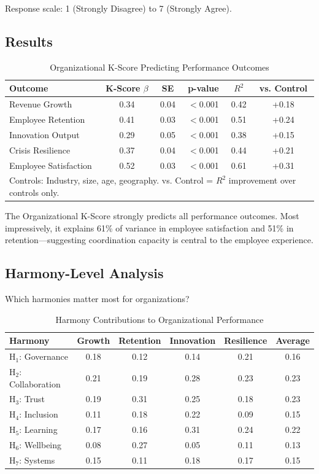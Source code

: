 \documentclass[12pt,a4paper]{article}
\begin{document}
Response scale: 1 (Strongly Disagree) to 7 (Strongly Agree).

\subsection{Results}

\begin{table}[H]
\centering
\caption{Organizational K-Score Predicting Performance Outcomes}
\label{tab:org_results}
\begin{tabular}{lccccc}
\toprule
\textbf{Outcome} & \textbf{K-Score $\beta$} & \textbf{SE} & \textbf{p-value} & \textbf{$R^2$} & \textbf{vs. Control} \\
\midrule
Revenue Growth & 0.34 & 0.04 & $<$0.001 & 0.42 & +0.18 \\
Employee Retention & 0.41 & 0.03 & $<$0.001 & 0.51 & +0.24 \\
Innovation Output & 0.29 & 0.05 & $<$0.001 & 0.38 & +0.15 \\
Crisis Resilience & 0.37 & 0.04 & $<$0.001 & 0.44 & +0.21 \\
Employee Satisfaction & 0.52 & 0.03 & $<$0.001 & 0.61 & +0.31 \\
\bottomrule
\multicolumn{6}{l}{\small Controls: Industry, size, age, geography. vs. Control = $R^2$ improvement over controls only.}
\end{tabular}
\end{table}

The Organizational K-Score strongly predicts all performance outcomes. Most impressively, it explains 61\% of variance in employee satisfaction and 51\% in retention---suggesting coordination capacity is central to the employee experience.

\subsection{Harmony-Level Analysis}

Which harmonies matter most for organizations?

\begin{table}[H]
\centering
\caption{Harmony Contributions to Organizational Performance}
\label{tab:org_harmonies}
\begin{tabular}{lccccc}
\toprule
\textbf{Harmony} & \textbf{Growth} & \textbf{Retention} & \textbf{Innovation} & \textbf{Resilience} & \textbf{Average} \\
\midrule
H$_1$: Governance & 0.18 & 0.12 & 0.14 & 0.21 & 0.16 \\
H$_2$: Collaboration & 0.21 & 0.19 & 0.28 & 0.23 & 0.23 \\
H$_3$: Trust & 0.19 & 0.31 & 0.25 & 0.18 & 0.23 \\
H$_4$: Inclusion & 0.11 & 0.18 & 0.22 & 0.09 & 0.15 \\
H$_5$: Learning & 0.17 & 0.16 & 0.31 & 0.24 & 0.22 \\
H$_6$: Wellbeing & 0.08 & 0.27 & 0.05 & 0.11 & 0.13 \\
H$_7$: Systems & 0.15 & 0.11 & 0.18 & 0.17 & 0.15 \\
\bottomrule
\end{tabular}
\end{table}
\end{document}
